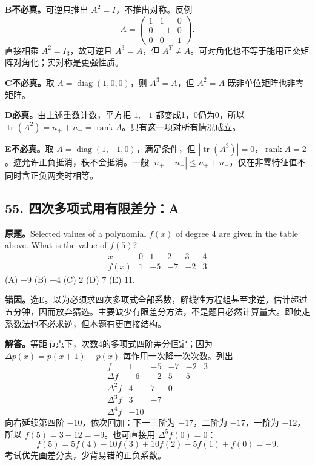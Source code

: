 \documentclass[11pt,a4paper,fontset=fandol]{ctexart}
\begin{document}
\textbf{B不必真。}可逆只推出 $A^2=I$，不推出对称。反例
\[
A=\begin{pmatrix}1&1&0\\0&-1&0\\0&0&1\end{pmatrix}.
\]
直接相乘 $A^2=I_3$，故可逆且 $A^3=A$，但 $A^T\ne A$。可对角化也不等于能用正交矩阵对角化；实对称是更强性质。

\textbf{C不必真。}取 $A=\operatorname{diag}(1,0,0)$，则 $A^3=A$，但 $A^2=A$ 既非单位矩阵也非零矩阵。

\textbf{D必真。}由上述重数计数，平方把 $1,-1$ 都变成1，0仍为0，所以 $\operatorname{tr}(A^2)=n_++n_-=\operatorname{rank}A$。只有这一项对所有情况成立。

\textbf{E不必真。}取 $A=\operatorname{diag}(1,-1,0)$，满足条件，但 $|\operatorname{tr}(A^3)|=0$，$\operatorname{rank}A=2$。迹允许正负抵消，秩不会抵消。一般 $|n_+-n_-|\le n_++n_-$，仅在非零特征值不同时含正负两类时相等。

\subsection{55. 四次多项式用有限差分：A}
\label{ms:q55}
\textbf{原题。}Selected values of a polynomial $f(x)$ of degree 4 are given in the table above. What is the value of $f(5)$?
\[
\begin{array}{c|rrrrr}x&0&1&2&3&4\\\hline f(x)&1&-5&-7&-2&3\end{array}
\]
(A) $-9$ \quad (B) $-4$ \quad (C) $2$ \quad (D) $7$ \quad (E) $11$.

\textbf{错因。}选E。以为必须求四次多项式全部系数，解线性方程组甚至求逆，估计超过五分钟，因而放弃猜选。主要缺少有限差分方法，不是题目必然计算量大。即使走系数法也不必求逆，但本题有更直接结构。

\textbf{解答。}等距节点下，次数4的多项式四阶差分恒定；因为 $\Delta p(x)=p(x+1)-p(x)$ 每作用一次降一次次数。列出
\[
\begin{array}{c|rrrrr}
f&1&-5&-7&-2&3\\
\Delta f&-6&-2&5&5\\
\Delta^2f&4&7&0\\
\Delta^3f&3&-7\\
\Delta^4f&-10
\end{array}
\]
向右延续第四阶 $-10$，依次回加：下一三阶为 $-17$，二阶为 $-17$，一阶为 $-12$，所以 $f(5)=3-12=-9$。也可直接用 $\Delta^5 f(0)=0$：
\[
f(5)=5f(4)-10f(3)+10f(2)-5f(1)+f(0)=-9.
\]
考试优先画差分表，少背易错的正负系数。
\end{document}
